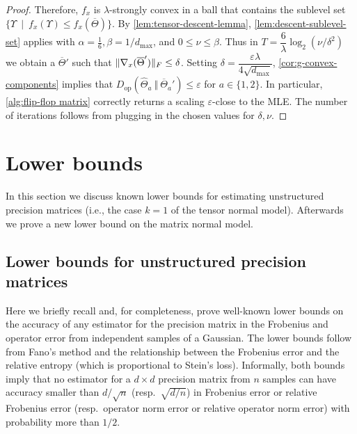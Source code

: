\documentclass[aos]{imsart}
\theoremstyle{definition}
\numberwithin{equation}{section}
\DeclarePairedDelimiter{\norm}{\lVert}{\rVert}
\newcommand{\otheta}{\overline{\Theta}}
\newcommand{\htheta}{\widehat{\Theta}}
\newcommand{\eps}{\varepsilon}
\newcommand{\Dop}{D_{\operatorname{op}}}
\def\dmax{d_{\max}}
\newcommand{\CF}[1]{{\color{purple}[CF: #1]}}
\newcommand{\CF}[1]{{}}
\begin{document}
\begin{proof}
Therefore, $f_x$ is $\lambda$-strongly convex in a ball that contains the sublevel set $\{ \Upsilon \ \mid \ f_x(\Upsilon) \leq f_x(\otheta) \}$. By \cref{lem:tensor-descent-lemma}, \cref{lem:descent-sublevel-set} applies with $\alpha = \frac{1}{6}, \beta = 1/\dmax$, and $0 \leq \nu \leq \beta$. Thus in $T = \dfrac{6}{\lambda} \log_2(\nu/\delta^2)$ we obtain a  $\otheta'$ such that $\norm{\nabla_x(\otheta')}_F \leq \delta$. Setting $\delta = \dfrac{\varepsilon \lambda}{4 \sqrt{\dmax}}$, \cref{cor:g-convex-components} implies that $\Dop(\htheta_a \ \Vert  \ \otheta_a') \leq \varepsilon$ for $a \in \{1, 2\}$. In particular, \cref{alg:flip-flop matrix} correctly returns a scaling $\eps$-close to the MLE. The number of iterations follows from plugging in the chosen values for $\delta, \nu$.
\end{proof}

\section{Lower bounds}\label{sec:lower}
In this section we discuss known lower bounds for estimating unstructured precision matrices (i.e., the case $k= 1$ of the tensor normal model). Afterwards we prove a new lower bound on the matrix normal model.

\subsection{Lower bounds for unstructured precision matrices}
Here we briefly recall and, for completeness, prove well-known lower bounds on the accuracy of any estimator for the precision matrix in the Frobenius and operator error from independent samples of a Gaussian. The lower bounds follow from Fano's method and the relationship between the Frobenius error and the relative entropy (which is proportional to Stein's loss).
Informally, both bounds imply that no estimator for a $d\times d$ precision matrix from $n$ samples can have accuracy smaller than $d/\sqrt{n}$ (resp.\ $\sqrt{d/n}$) in Frobenius error or relative Frobenius error (resp.\ operator norm error or relative operator norm error) with probability more than $1/2$.
\end{document}
